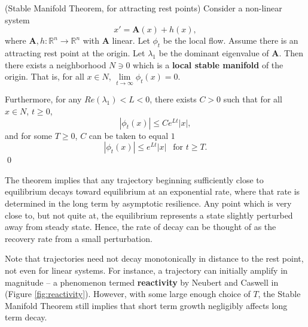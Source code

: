\begin{theorem}(Stable Manifold Theorem, for attracting rest points)
	Consider a non-linear system 
	$$x' = \mathbf{A}(x) + h(x),$$ 
	where $\mathbf{A}, h: \mathbb{R}^n \to \mathbb{R}^n$ with $\mathbf{A}$ linear.  Let $\phi_t$ be the local flow.
	Assume there is an attracting rest point at the origin. 
	Let $\lambda_1$ be the dominant eigenvalue of $\mathbf{A}$. Then there exists a neighborhood $N \ni 0$ which is a \textbf{local stable manifold} of the origin. 
	That is, for all $x \in N$, $\lim\limits_{t \to \infty} \phi_t(x)= 0$.
	
	Furthermore, for any $Re(\lambda_1) < L < 0$, there exists $C >0$ such that for all $x \in N$, $t \geq 0$,
	$$|\phi_t(x)| \leq Ce^{Lt}|x|,$$
 	and for some $T \geq 0$, $C$ can be taken to equal $1$
	$$|\phi_t(x)| \leq e^{L t}|x| ~ ~\text{ for } t \geq T.$$
	\qed
\end{theorem}


The theorem implies that any trajectory beginning sufficiently close to equilibrium decays toward equilibrium at an exponential rate, where that rate is determined in the long term by asymptotic resilience. Any point which is very close to, but not quite at, the equilibrium represents a state slightly perturbed away from steady state. Hence, the rate of decay can be thought of as the recovery rate from a small perturbation. 


\begin{remark}
	Note that trajectories need not decay monotonically in distance to the rest point, not even for linear systems. For instance, a trajectory can initially amplify in magnitude -- a phenomenon termed \textbf{reactivity} by Neubert and Caswell in \cite{neubertAlternativesResilienceMeasuring1997} (Figure \ref{fig:reactivity}). However, with some large enough choice of $T$, the Stable Manifold Theorem still implies that short term growth negligibly affects long term decay. 
\end{remark}	

